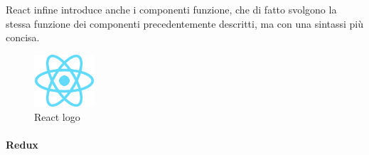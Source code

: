 React infine introduce anche i componenti funzione, che di fatto svolgono la stessa funzione dei componenti precedentemente descritti, ma con una sintassi più concisa.

\begin{figure}[H]
\centering
\includegraphics[width=0.2\textwidth]{img/logos/react_logo.png}
\caption{React logo}
\label{fig:react}
\end{figure}


\paragraph{Redux}

